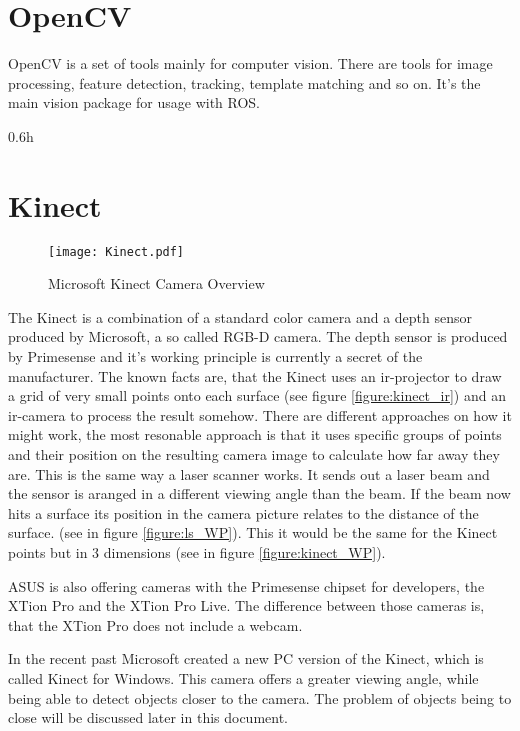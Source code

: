 
\clearpage

\section{OpenCV}
OpenCV is a set of tools mainly for computer vision. There are tools for image processing, feature detection, tracking,
template matching and so on. It's the main vision package for usage with ROS.

{0.6}{h}

\section{Kinect}

\begin{figure}[h]
	\centering
	\texttt{[image: Kinect.pdf]}
	\caption{Microsoft Kinect Camera Overview}
	\label{figure:kinect_ir}
\end{figure}

The Kinect is a combination of a standard color camera and a depth sensor produced by Microsoft, a so called RGB-D camera. 
The depth sensor is produced by Primesense and it's working principle is currently a secret of the manufacturer. 
The known facts are, that the Kinect uses an ir-projector to draw a grid of very small points onto each surface 
(see figure \vref{figure:kinect_ir}) and an ir-camera to process the result somehow.  
There are different approaches on how it might work, the most resonable approach is that it uses 
specific groups of points and their position on the resulting camera image to calculate how far 
away they are. This is the same way a laser scanner works. 
It sends out a laser beam and the sensor is aranged in a different viewing angle than the beam.
If the beam now hits a surface its position in the camera picture relates to the distance of the surface.
(see in figure \vref{figure:ls_WP}). This it would be the same for the Kinect points but in 3 dimensions 
(see in figure \vref{figure:kinect_WP}).

ASUS is also offering cameras with the Primesense chipset for developers, the XTion Pro and the XTion Pro Live.
The difference between those cameras is, that the XTion Pro does not include a webcam.

In the recent past Microsoft created a new PC version of the Kinect, which is called Kinect for Windows.
This camera offers a greater viewing angle, while being able to detect objects closer to the camera.
The problem of objects being to close will be discussed later in this document.

